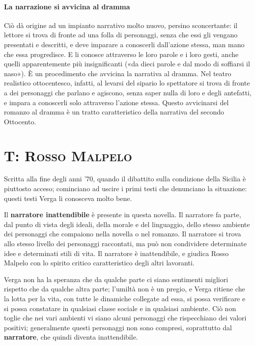 \documentclass{book}
\begin{document}
\paragraph{La narrazione si avvicina al dramma} Ciò dà origine ad un impianto narrativo molto nuovo, persino sconcertante: il lettore si trova di fronte ad una folla di personaggi, senza che essi gli vengano presentati e descritti, e deve imparare a conoscerli dall'azione stessa, man mano che essa progredisce. E li conosce attraverso le loro parole e i loro gesti, anche quelli apparentemente più insignificanti («da dieci parole e dal modo di soffiarsi il naso»). È un procedimento che avvicina la narrativa al dramma. Nel teatro realistico ottocentesco, infatti, al levarsi del sipario lo spettatore si trova di fronte a dei personaggi che parlano e agiscono, senza saper nulla di loro e degli antefatti, e impara a conoscerli solo attraverso l'azione stessa. Questo avvicinarsi del romanzo al dramma è un tratto caratteristico della narrativa del secondo Ottocento.

\section{T: \textsc{Rosso Malpelo}}

Scritta alla fine degli anni '70, quando il dibattito sulla condizione
della Sicilia è piuttosto acceso; cominciano ad uscire i primi testi che
denunciano la situazione: questi testi Verga li conosceva molto bene.

Il \textbf{narratore inattendibile} è presente in questa novella. Il
narratore fa parte, dal punto di vista degli ideali, della morale e del
linguaggio, dello stesso ambiente dei personaggi che compaiono nella
novella o nel romanzo. Il narratore si trova allo stesso livello dei
personaggi raccontati, ma può non condividere determinate idee e
determinati stili di vita. Il narratore è inattendibile, e giudica Rosso
Malpelo con lo spirito critico caratteristico degli altri lavoranti.

Verga non ha la speranza che da qualche parte ci siano sentimenti
migliori rispetto che da qualche altra parte; l'umiltà non è un pregio,
e Verga ritiene che la lotta per la vita, con tutte le dinamiche
collegate ad essa, si possa verificare e si possa constatare in
qualsiasi classe sociale e in qualsiasi ambiente. Ciò non toglie che nei
vari ambienti vi siano alcuni personaggi che rispecchiano dei valori
positivi; generalmente questi personaggi non sono compresi, soprattutto
dal \textbf{narratore}, che quindi diventa inattendibile.
\end{document}
